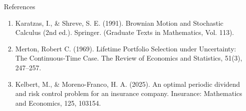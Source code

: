 \documentclass{beamer}
\theoremstyle{definition}
\begin{document}
\begin{frame}{References}
\begin{enumerate}
    \item Karatzas, I., \& Shreve, S. E. (1991). Brownian Motion and Stochastic Calculus (2nd ed.). Springer. (Graduate Texts in Mathematics, Vol. 113).
    \item  Merton, Robert C. (1969). Lifetime Portfolio Selection under Uncertainty: The Continuous-Time Case. The Review of Economics and Statistics, 51(3), 247–257.
    \item Kelbert, M., \& Moreno-Franco, H. A. (2025). An optimal periodic dividend and risk control problem for an insurance company. Insurance: Mathematics and Economics, 125, 103154.
\end{enumerate}
\end{frame}   
\end{document}

